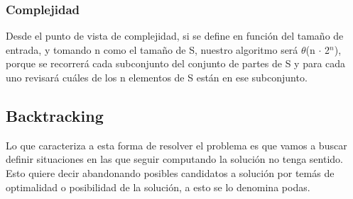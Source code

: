 \documentclass[8pt,a4paper]{article}
\begin{document}
\subsubsection{Complejidad}
Desde el punto de vista de complejidad, si se define en función del tamaño de entrada, y tomando n como el tamaño de S, nuestro algoritmo será $\theta$(n $\cdot$ 2$^{n}$), porque se recorrerá cada subconjunto del conjunto de partes de S y para cada uno revisará cuáles de los n elementos de S están en ese subconjunto.\\

\subsection{Backtracking}
Lo que caracteriza a esta forma de resolver el problema es que vamos a buscar definir situaciones en las que seguir computando la solución no tenga sentido. Esto quiere decir abandonando posibles candidatos a solución por temás de optimalidad o posibilidad de la solución, a esto se lo denomina podas. \\

\end{document}
